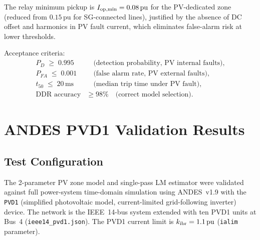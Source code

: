 \documentclass[11pt, a4paper]{article}
\newcommand{\pu}{\,\text{pu}}
\newcommand{\ms}{\,\text{ms}}
\newcommand{\kIBR}{k_{\rm ibr}}
\begin{document}
\noindent The relay minimum pickup is $I_{\rm op,min} = 0.08\pu$ for the PV-dedicated zone
(reduced from $0.15\pu$ for SG-connected lines), justified by the absence of DC
offset and harmonics in PV fault current, which eliminates false-alarm risk at
lower thresholds.

Acceptance criteria:
\begin{align}
  P_D \;\geq\; 0.995 &\quad\text{(detection probability, PV internal faults)}, \nonumber\\
  P_{FA} \;\leq\; 0.001 &\quad\text{(false alarm rate, PV external faults)}, \nonumber\\
  t_{50} \;\leq\; 20\ms &\quad\text{(median trip time under PV fault)}, \nonumber\\
  \text{DDR accuracy} &\geq 98\% \quad\text{(correct model selection)}.
\end{align}

\section{ANDES PVD1 Validation Results}
\label{sec:andes}

\subsection{Test Configuration}

The 2-parameter PV zone model and single-pass LM estimator were validated
against full power-system time-domain simulation using ANDES~v1.9 with the
\texttt{PVD1} (simplified photovoltaic model, current-limited grid-following
inverter) device.  The network is the IEEE~14-bus system extended with ten
PVD1 units at Bus~4 (\texttt{ieee14\_pvd1.json}).  The PVD1 current limit is
$\kIBR = 1.1\,\text{pu}$ (\texttt{ialim} parameter).
\end{document}
